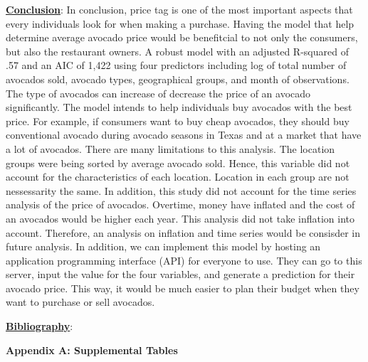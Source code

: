 \documentclass[11pt]{article}\usepackage[]{graphicx}\usepackage[]{color}
\begin{document}
\noindent\textbf{\underline{Conclusion}}: In conclusion, price tag is one of the most important aspects that every individuals look for when making a purchase. Having the model that help determine average avocado price would be benefitcial to not only the consumers, but also the restaurant owners. A robust model with an adjusted R-squared of .57 and an AIC of 1,422 using four predictors including log of total number of avocados sold, avocado types, geographical groups, and month of observations. The type of avocados can increase of decrease the price of an avocado significantly. The model intends to help individuals buy avocados with the best price. For example, if consumers want to buy cheap avocados, they should buy conventional avocado during avocado seasons in Texas and at a market that have a lot of avocados. There are many limitations to this analysis. The location groups were being sorted by average avocado sold. Hence, this variable did not account for the characteristics of each location. Location in each group are not nessessarity the same. In addition, this study did not account for the time series analysis of the price of avocados. Overtime, money have inflated and the cost of an avocados would be higher each year. This analysis did not take inflation into account. Therefore, an analysis on inflation and time series would be consisder in future analysis. In addition, we can implement this model by hosting an application programming interface (API) for everyone to use. They can go to this server, input the value for the four variables, and generate a prediction for their avocado price. This way, it would be much easier to plan their budget when they want to purchase or sell avocados.      
\hfill \break


\clearpage
\noindent\textbf{\underline{Bibliography}}:
\hfill \break


\clearpage
\newpage
\noindent \Large{{\bf Appendix A: Supplemental Tables}}
\end{document}
